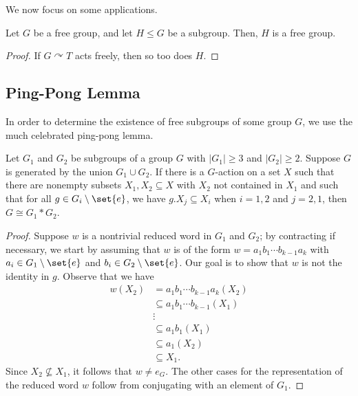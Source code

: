 \documentclass[10pt]{mypackage}
\begin{document}
We now focus on some applications. 
\begin{theorem}
  Let $G$ be a free group, and let $H\leq G$ be a subgroup. Then, $H$ is a free group.
\end{theorem}
\begin{proof}
  If $G\curvearrowright T$ acts freely, then so too does $H$. 
\end{proof}
\subsection{Ping-Pong Lemma}%
In order to determine the existence of free subgroups of some group $G$, we use the much celebrated ping-pong lemma.
\begin{theorem}
  Let $G_1$ and $G_2$ be subgroups of a group $G$ with $\left\vert G_1 \right\vert\geq 3$ and $ \left\vert G_2 \right\vert\geq 2 $. Suppose $G$ is generated by the union $G_1\cup G_2$. If there is a $G$-action on a set $X$ such that there are nonempty subsets $X_1,X_2\subseteq X$ with $X_2$ not contained in $X_1$ and such that for all $g\in G_i\setminus \set{e}$, we have $g.X_{j}\subseteq X_i$ when $i=1,2$ and $j=2,1$, then $G\cong G_1\ast G_2$.
\end{theorem}
\begin{proof}
  Suppose $w$ is a nontrivial reduced word in $G_1$ and $G_2$; by contracting if necessary, we start by assuming that $w$ is of the form $w = a_1b_1\cdots b_{k-1}a_k$ with $a_i\in G_1\setminus \set{e}$ and $b_i\in G_2\setminus \set{e}$. Our goal is to show that $w$ is not the identity in $g$. Observe that we have
  \begin{align*}
    w\left( X_2 \right) &= a_1b_1\cdots b_{k-1}a_k\left( X_2 \right)\\
                        &\subseteq a_1b_1\cdots b_{k-1}\left( X_1 \right)\\
                        &\vdots\\
                        &\subseteq a_1b_1\left( X_1 \right)\\
                        &\subseteq a_1\left( X_2 \right)\\
                        &\subseteq X_1.
  \end{align*}
  Since $X_2\nsubseteq X_1$, it follows that $w\neq e_G$. The other cases for the representation of the reduced word $w$ follow from conjugating with an element of $G_1$.
\end{proof}
\end{document}
